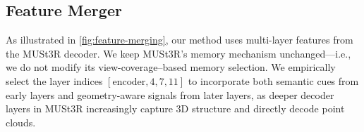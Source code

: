 \subsection{Feature Merger}


As illustrated in \cref{fig:feature-merging}, our method uses multi-layer features from the MUSt3R decoder.  
We keep MUSt3R’s memory mechanism unchanged—i.e., we do not modify its view-coverage–based memory selection.  
We empirically select the layer indices $[\text{encoder}, 4, 7, 11]$ to incorporate both semantic cues from early layers and geometry-aware signals from later layers, as deeper decoder layers in MUSt3R increasingly capture 3D structure and directly decode point clouds.

